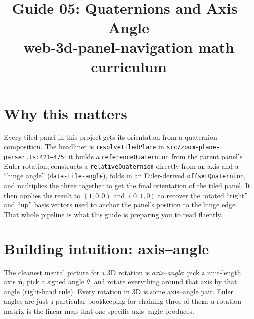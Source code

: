 \documentclass{article}
\title{Guide 05: Quaternions and Axis--Angle\\
\large web-3d-panel-navigation math curriculum}
\author{}
\date{}
\begin{document}
\maketitle

\section{Why this matters}

Every tiled panel in this project gets its orientation from a quaternion
composition. The headliner is \texttt{resolveTiledPlane} in
\texttt{src/zoom-plane-parser.ts:421--475}: it builds a
\texttt{referenceQuaternion} from the parent panel's Euler rotation,
constructs a \texttt{relativeQuaternion} directly from an axis and a
``hinge angle'' (\texttt{data-tile-angle}), folds in an Euler-derived
\texttt{offsetQuaternion}, and multiplies the three together to get the
final orientation of the tiled panel. It then applies the result to
$(1,0,0)$ and $(0,1,0)$ to recover the rotated ``right'' and ``up''
basis vectors used to anchor the panel's position to the hinge edge.
That whole pipeline is what this guide is preparing you to read fluently.

\section{Building intuition: axis--angle}

The cleanest mental picture for a 3D rotation is \emph{axis--angle}: pick
a unit-length axis $\hat{\mathbf{n}}$, pick a signed angle $\theta$, and
rotate everything around that axis by that angle (right-hand rule). Every
rotation in 3D is some axis--angle pair. Euler angles are just a
particular bookkeeping for chaining three of them; a rotation matrix is
the linear map that one specific axis--angle produces.

\begin{center}
\end{center}
\end{document}
